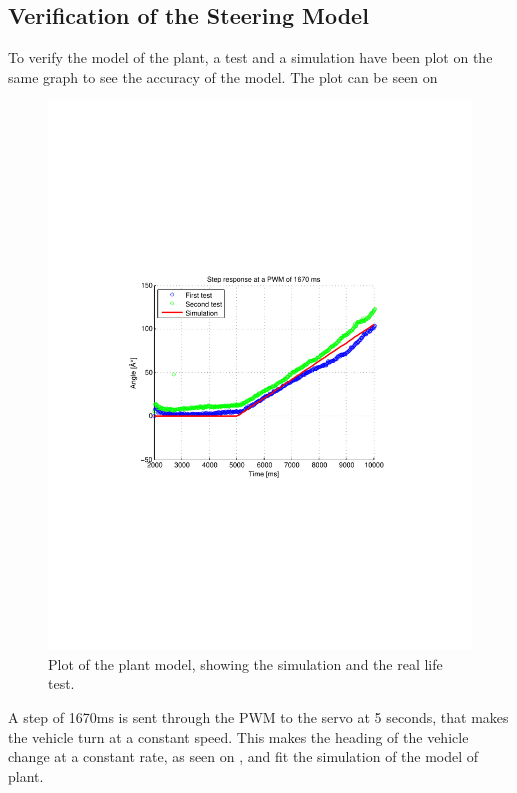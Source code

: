 \subsection{Verification of the Steering Model}

To verify the model of the plant, a test and a simulation have been plot on the same graph to see the accuracy of the model. The plot can be seen on 

\begin{figure}[H]
  \centering
  \includegraphics[scale=0.8]{figures/plotVerificationSteeringPlant.pdf}
  \caption{Plot of the plant model, showing the simulation and the real life test.}
  \label{fig:plotVerificationSteeringPlant}
\end{figure}

A step of 1670ms is sent through the PWM to the servo at 5 seconds, that makes the vehicle turn at a constant speed. This makes the heading of the vehicle change at a constant rate, as seen on , and fit the simulation of the model of plant.


